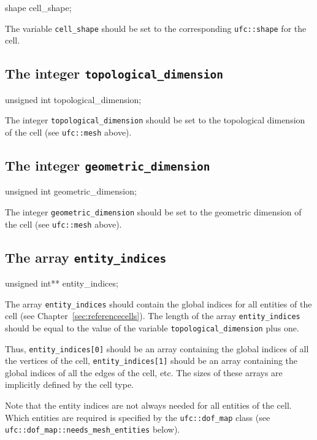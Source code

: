 \begin{code}
shape cell_shape;
\end{code}

The variable \texttt{cell\_shape} should be set to the corresponding
\texttt{ufc::shape} for the cell.

\subsection{The integer \texttt{topological\_dimension}}

\begin{code}
unsigned int topological_dimension;
\end{code}

The integer \texttt{topological\_dimension} should be set to the
topological dimension of the cell (see \texttt{ufc::mesh} above).

\subsection{The integer \texttt{geometric\_dimension}}

\begin{code}
unsigned int geometric_dimension;
\end{code}

The integer \texttt{geometric\_dimension} should be set to the
geometric dimension of the cell (see \texttt{ufc::mesh} above).

\subsection{The array \texttt{entity\_indices}}

\begin{code}
unsigned int** entity_indices;
\end{code}

The array \texttt{entity\_indices} should contain the global indices
for all entities of the cell (see Chapter~\ref{sec:referencecells}).
The length of the array \texttt{entity\_indices} should be equal to
the value of the variable \texttt{topological\_dimension} plus one.

Thus, \texttt{entity\_indices[0]} should be an array containing the
global indices of all the vertices of the cell,
\texttt{entity\_indices[1]} should be an array containing the global
indices of all the edges of the cell, etc. The sizes of these arrays
are implicitly defined by the cell type.

Note that the entity indices are not always needed for all entities of
the cell. Which entities are required is specified by the
\texttt{ufc::dof\_map} class (see
\texttt{ufc::dof\_map::needs\_mesh\_entities} below).

